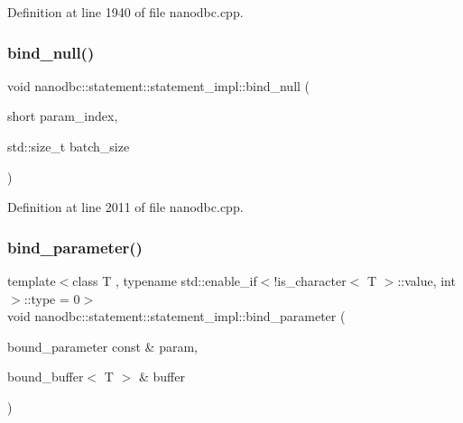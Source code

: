 Definition at line 1940 of file nanodbc.\+cpp.

\mbox{\label{classnanodbc_1_1statement_1_1statement__impl_a1eb6f1b266ea0523b6528b2ca23610e6}} 
\subsubsection{\texorpdfstring{bind\_null()}{bind\_null()}}
{\footnotesize\ttfamily void nanodbc\+::statement\+::statement\+\_\+impl\+::bind\+\_\+null (\begin{DoxyParamCaption}\item[{short}]{param\+\_\+index,  }\item[{std\+::size\+\_\+t}]{batch\+\_\+size }\end{DoxyParamCaption})\hspace{0.3cm}{\ttfamily [inline]}}



Definition at line 2011 of file nanodbc.\+cpp.

\mbox{\label{classnanodbc_1_1statement_1_1statement__impl_a8d3802d770a7e45ad53433728e9daa34}} 
\subsubsection{\texorpdfstring{bind\_parameter()}{bind\_parameter()}\hspace{0.1cm}{\footnotesize\ttfamily [1/2]}}
{\footnotesize\ttfamily template$<$class T , typename std\+::enable\+\_\+if$<$!is\+\_\+character$<$ T $>$\+::value, int $>$\+::type  = 0$>$ \\
void nanodbc\+::statement\+::statement\+\_\+impl\+::bind\+\_\+parameter (\begin{DoxyParamCaption}\item[{bound\+\_\+parameter const \&}]{param,  }\item[{bound\+\_\+buffer$<$ T $>$ \&}]{buffer }\end{DoxyParamCaption})\hspace{0.3cm}{\ttfamily [inline]}}



